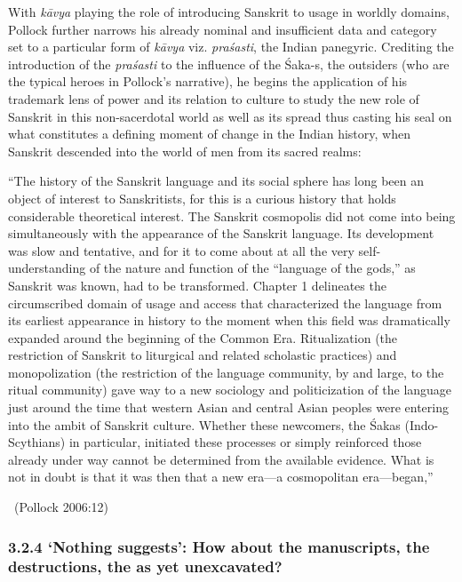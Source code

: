 With \textit{kāvya} playing the role of introducing Sanskrit to usage in worldly domains, Pollock further narrows his already nominal and insufficient data and category set to a particular form of \textit{kāvya} viz. \textit{praśasti}, the Indian panegyric. Crediting the introduction of the \textit{praśasti} to the influence of the Śaka-s, the outsiders (who are the typical heroes in Pollock’s narrative), he begins the application of his trademark lens of power and its relation to culture to study the new role of Sanskrit in this non-sacerdotal world as well as its spread thus casting his seal on what constitutes a defining moment of change in the Indian history, when Sanskrit descended into the world of men from its sacred realms:

\begin{myquote}
“The history of the Sanskrit language and its social sphere has long been an object of interest to Sanskritists, for this is a curious history that holds considerable theoretical interest. The Sanskrit cosmopolis did not come into being simultaneously with the appearance of the Sanskrit language. Its development was slow and tentative, and for it to come about at all the very self-understanding of the nature and function of the “language of the gods,” as Sanskrit was known, had to be transformed. Chapter 1 delineates the circumscribed domain of usage and access that characterized the language from its earliest appearance in history to the moment when this field was dramatically expanded around the beginning of the Common Era. Ritualization (the restriction of Sanskrit to liturgical and related scholastic practices) and monopolization (the restriction of the language community, by and large, to the ritual community) gave way to a new sociology and politicization of the language just around the time that western Asian and central Asian peoples were entering into the ambit of Sanskrit culture. Whether these newcomers, the Śakas (Indo-Scythians) in particular, initiated these processes or simply reinforced those already under way cannot be determined from the available evidence. What is not in doubt is that it was then that a new era—a cosmopolitan era—began,” 

~\hfill (Pollock 2006:12)
\end{myquote}


\subsubsection*{3.2.4 ‘Nothing suggests’: How about the manuscripts, the destructions, the as yet unexcavated?}

